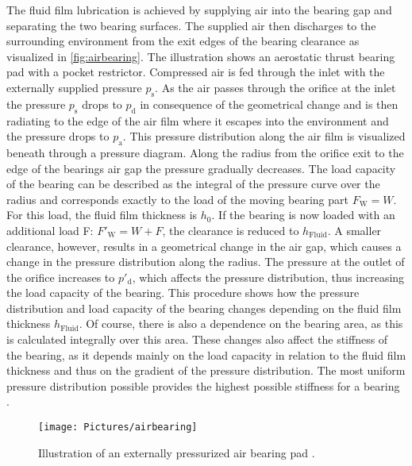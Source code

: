 The fluid film lubrication is achieved by supplying air into the bearing gap and separating the two bearing surfaces. The supplied air then discharges to the surrounding environment from the exit edges of the bearing clearance as visualized in \autoref{fig:airbearing}. The illustration shows an aerostatic thrust bearing pad with a pocket restrictor. Compressed air is fed through the inlet with the externally supplied pressure $p_\text{s}$. As the air passes through the orifice at the inlet the pressure $p_\text{s}$ drops to $p_\text{d}$ in consequence of the geometrical change and is then radiating to the edge of the air film where it escapes into the environment and the pressure drops to $p_\text{a}$. This pressure distribution along the air film is visualized beneath through a pressure diagram. Along the radius from the orifice exit to the edge of the bearings air gap the pressure gradually decreases. The load capacity of the bearing can be described as the integral of the pressure curve over the radius and corresponds exactly to the load of the moving bearing part $F_\text{W}=W$. For this load, the fluid film thickness is $h_\text{0}$. If the bearing is now loaded with an additional load F: $F'_\text{W}=W+F$, the clearance is reduced to $h_\text{Fluid}$. A smaller clearance, however, results in a geometrical change in the air gap, which causes a change in the pressure distribution along the radius. The pressure at the outlet of the orifice increases to $p'_\text{d}$, which affects the pressure distribution, thus increasing the load capacity of the bearing. This procedure shows how the pressure distribution and load capacity of the bearing changes depending on the fluid film thickness $h_\text{Fluid}$. Of course, there is also a dependence on the bearing area, as this is calculated integrally over this area. These changes also affect the stiffness of the bearing, as it depends mainly on the load capacity in relation to the fluid film thickness and thus on the gradient of the pressure distribution. The most uniform pressure distribution possible provides the highest possible stiffness for a bearing \cite{Hamrock.1991}\cite{Gao.2019}\cite{NewWayAirBearingsInc..2006}.


\begin{figure}[H]
{\centering
\texttt{[image: Pictures/airbearing]}
\caption{Illustration of an externally pressurized air bearing pad \cite{Gao.2019}.}
\label{fig:airbearing}
}
\end{figure}


